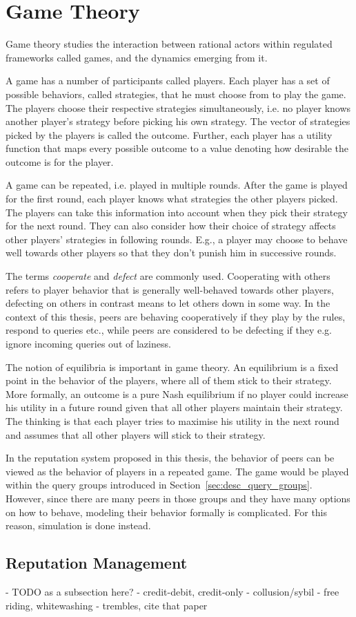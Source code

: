 \section{Game Theory}
Game theory studies the interaction between rational actors within regulated
frameworks called games, and the dynamics emerging from it.

A game has a number of participants called players. Each player has a set of
possible behaviors, called strategies, that he must choose from to play the
game. The players choose their respective strategies simultaneously, i.e. no
player knows another player's strategy before picking his own strategy. The
vector of strategies picked by the players is called the outcome. Further, each
player has a utility function that maps every possible outcome to a value
denoting how desirable the outcome is for the player.

A game can be repeated, i.e. played in multiple rounds. After the game is played
for the first round, each player knows what strategies the other players picked.
The players can take this information into account when they pick their strategy
for the next round. They can also consider how their choice of strategy affects
other players' strategies in following rounds. E.g., a player may choose to
behave well towards other players so that they don't punish him in successive
rounds.

The terms \emph{cooperate} and \emph{defect} are commonly used. Cooperating with
others refers to player behavior that is generally well-behaved towards other
players, defecting on others in contrast means to let others down in some way.
In the context of this thesis, peers are behaving cooperatively if they play by
the rules, respond to queries etc., while peers are considered to be defecting
if they e.g. ignore incoming queries out of laziness.

The notion of equilibria is important in game theory. An equilibrium is a fixed
point in the behavior of the players, where all of them stick to their strategy.
More formally, an outcome is a pure Nash equilibrium if no player could increase
his utility in a future round given that all other players maintain their
strategy. The thinking is that each player tries to maximise his utility in the
next round and assumes that all other players will stick to their strategy.

In the reputation system proposed in this thesis, the behavior of peers can be
viewed as the behavior of players in a repeated game. The game would be played
within the query groups introduced in Section~\ref{sec:desc_query_groups}.
However, since there are many peers in those groups and they have many options
on how to behave, modeling their behavior formally is complicated. For this
reason, simulation is done instead.

\subsection{Reputation Management}
- TODO as a subsection here?
- credit-debit, credit-only
- collusion/sybil
- free riding, whitewashing
- trembles, cite that paper
